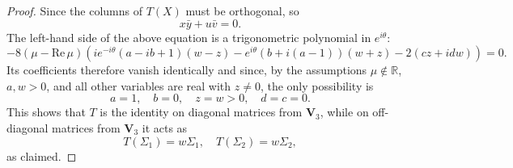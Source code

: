 \documentclass[11pt]{article}
\numberwithin{equation}{section}
\def\IR{{\mathbb R}}
\def\bV{{\mathbf V}}
\def\bV{{\mathbf V}}
\begin{document}
\begin{proof}
Since  the columns of $T(X)$  must be orthogonal, so
\begin{equation}\label{orth-cols1anew}
	x \bar{y} + u \bar{v} = 0.
\end{equation}
The left-hand side of the above equation is a trigonometric polynomial in $e^{i\theta}$:
 $$-8(\mu-\mathrm{Re}\,\mu  )  \left(i e^{-i \theta } (a-i b+1) (w-z)-e^{i \theta } (b+i (a-1)) (w+z)-2 (c z+i d w)\right)=0.$$
Its coefficients therefore vanish identically and since, by the assumptions $\mu\notin\IR$, $a,w>0$, and all other variables are real with $z \ne 0$, the only possibility is
$$a=1,\quad b=0,\quad z=w>0,\quad d=c=0.$$
This shows that $T$ is the identity on diagonal matrices from $\bV_3$, while on off-diagonal matrices from $\bV_3$ it acts as
$$T(\Sigma_1)=w \Sigma_1,\quad T(\Sigma_2)=w\Sigma_2,$$
as claimed.
\end{proof}
\end{document}
